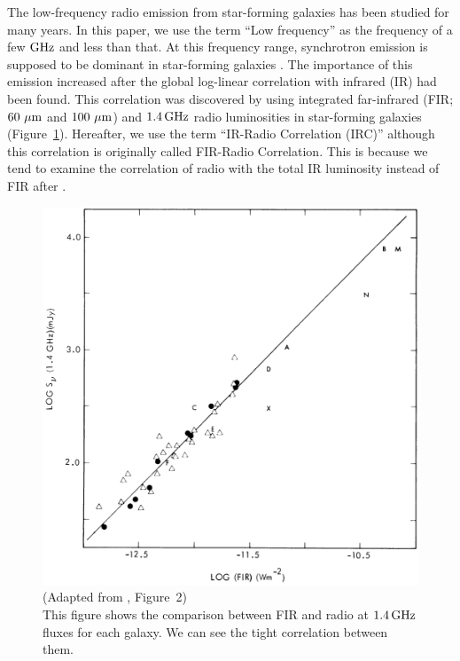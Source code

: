The low-frequency radio emission from star-forming galaxies has been studied for many years.
In this paper, we use the term ``Low frequency'' as the frequency of a few $\mathrm{GHz}$ and less than that.
At this frequency range, synchrotron emission is supposed to be dominant in star-forming galaxies \citep{Condon1992a}.
The importance of this emission increased after the global log-linear correlation with infrared (IR) had been found.
This correlation was discovered by \citet{Helou1985} using integrated far-infrared (FIR;\@$60\,\,\mathrm{\mu m}$ and $100\,\,\mathrm{\mu m}$) and $1.4\,\mathrm{GHz}$ radio luminosities in star-forming galaxies (Figure~\ref{fig:Helou1985_figure2}).
Hereafter, we use the term ``IR-Radio Correlation (IRC)'' although this correlation is originally called FIR-Radio Correlation.
This is because we tend to examine the correlation of radio with the total IR luminosity instead of FIR after \citet{Bell2003}.

\begin{figure}[htbp]
	\centering
	\includegraphics[width=.6\linewidth]{Chapter_1/Figures/Helou1985_Figure2.png}
    \caption[Adapted from \citet{Helou1985} (Figure~2)]{\label{fig:Helou1985_figure2}
        (Adapted from \citet{Helou1985}, Figure~2)\\
        This figure shows the comparison between FIR and radio at $1.4\,\mathrm{GHz}$ fluxes for each galaxy.
        We can see the tight correlation between them.
    }
\end{figure}

